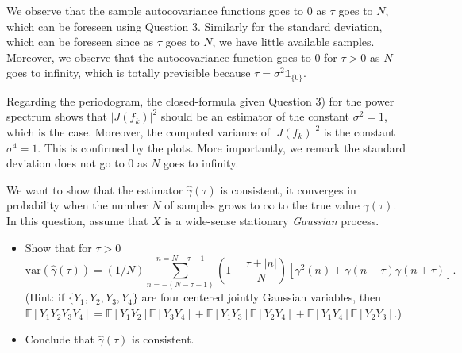 \documentclass[11pt]{article}
\begin{document}

\begin{solution}
    We observe that the sample autocovariance functions goes to $0$ as $\tau$ goes to $N$, which can be foreseen using Question 3.
    Similarly for the standard deviation, which can be foreseen since as $\tau$ goes to $N$, we have little available samples.
    Moreover, we observe that the autocovariance function goes to $0$ for $\tau > 0$ as $N$ goes to infinity, which is totally previsible because $\tau = \sigma^2\mathds{1}_{\{0\}}$.

    Regarding the periodogram, the closed-formula given Question 3) for the power spectrum shows that $|J(f_k)|^2$ should be an estimator of the constant $\sigma^2=1$, which is the case. Moreover, the computed variance of $|J(f_k)|^2$ is the constant $\sigma^4=1$. This is confirmed by the plots.
    More importantly, we remark the standard deviation does not go to $0$ as $N$ goes to infinity.
\end{solution}

\begin{exercise}
    We want to show that the estimator $\hat{\gamma}(\tau)$ is consistent, \ie it converges in probability when the number $N$ of samples grows to $\infty$ to the true value ${\gamma}(\tau)$.
    In this question, assume that $X$ is a wide-sense stationary \textit{Gaussian} process.
    \begin{itemize}
        \item Show that for $\tau>0$
    \begin{equation}
       \text{var}(\hat{\gamma}(\tau)) = (1/N) \sum_{n=-(N-\tau-1)}^{n=N-\tau-1} \left(1 - \frac{\tau + |n|}{N}\right) \left[\gamma^2(n) + \gamma(n-\tau)\gamma(n+\tau)\right].
    \end{equation}
    (Hint: if $\{Y_1, Y_2, Y_3, Y_4\}$ are four centered jointly Gaussian variables, then $\mathbb{E}[Y_1 Y_2 Y_3 Y_4] = \mathbb{E}[Y_1 Y_2]\mathbb{E}[Y_3 Y_4] + \mathbb{E}[Y_1 Y_3]\mathbb{E}[Y_2 Y_4] + \mathbb{E}[Y_1 Y_4]\mathbb{E}[Y_2 Y_3]$.)
    \item Conclude that $\hat{\gamma}(\tau)$ is consistent.
    \end{itemize}
\end{exercise}
\end{document}

